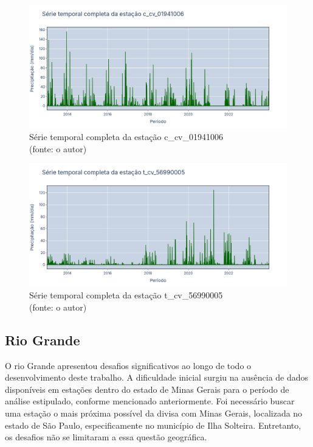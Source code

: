 \begin{figure}[!h]
	\centering
	\includegraphics[scale=0.25]{Figuras/rio_doce/doceSerieCompleta_c_cv_01941006.png}
	\caption{Série temporal completa da estação c\_cv\_01941006\\(fonte: o autor)}
	\label{fig:doceSerieCompleta_c_cv_01941006}
\end{figure}

\begin{figure}[!h]
	\centering
	\includegraphics[scale=0.25]{Figuras/rio_doce/doceSerieCompleta_t_cv_56990005.png}
	\caption{Série temporal completa da estação t\_cv\_56990005\\(fonte: o autor)}
	\label{fig:doceSerieCompleta_t_cv_56990005}
\end{figure}

\clearpage
\subsection{Rio Grande}

O rio Grande apresentou desafios significativos ao longo de todo o desenvolvimento deste trabalho. A dificuldade inicial surgiu na ausência de dados disponíveis em estações dentro do estado de Minas Gerais para o período de análise estipulado, conforme mencionado anteriormente. Foi necessário buscar uma estação o mais próxima possível da divisa com Minas Gerais, localizada no estado de São Paulo, especificamente no município de Ilha Solteira. Entretanto, os desafios não se limitaram a essa questão geográfica.

